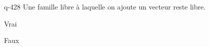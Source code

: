 \begin{truefalse}{q-428}
Une famille libre à laquelle on ajoute un vecteur reste libre.
\item Vrai
\item* Faux
\end{truefalse}

